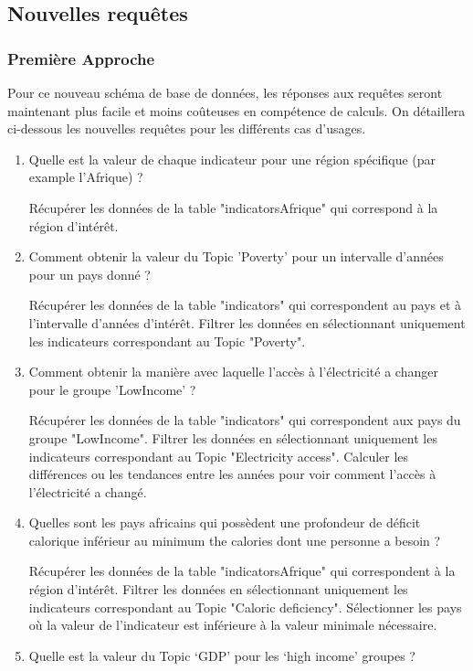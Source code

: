 \subsection{Nouvelles requêtes}
\subsubsection{Première Approche}
Pour ce nouveau schéma de base de données, les réponses aux requêtes seront maintenant plus facile et moins coûteuses en compétence de calculs. On détaillera ci-dessous les nouvelles requêtes pour les différents cas d'usages. 
\begin{enumerate} 
\item Quelle est la valeur de chaque indicateur pour une région spécifique (par example l’Afrique) ?

Récupérer les données de la table "indicatorsAfrique" qui correspond à la région d'intérêt.
\item Comment obtenir la valeur du Topic ’Poverty’ pour un intervalle d’années pour un pays donné ?

Récupérer les données de la table "indicators" qui correspondent au pays et à l'intervalle d'années d'intérêt.
Filtrer les données en sélectionnant uniquement les indicateurs correspondant au Topic "Poverty".
\item Comment obtenir la manière avec laquelle l’accès à l’électricité a changer pour le groupe ’LowIncome’ ?

Récupérer les données de la table "indicators" qui correspondent aux pays du groupe "LowIncome".
Filtrer les données en sélectionnant uniquement les indicateurs correspondant au Topic "Electricity access".
Calculer les différences ou les tendances entre les années pour voir comment l'accès à l'électricité a changé.
\item Quelles sont les pays africains qui possèdent une profondeur de déficit calorique inférieur au minimum the calories dont une personne a besoin ?

Récupérer les données de la table "indicatorsAfrique" qui correspondent à la région d'intérêt.
Filtrer les données en sélectionnant uniquement les indicateurs correspondant au Topic "Caloric deficiency".
Sélectionner les pays où la valeur de l'indicateur est inférieure à la valeur minimale nécessaire.
\item Quelle est la valeur du Topic ‘GDP’ pour les ‘high income’ groupes ?


\end{enumerate}
